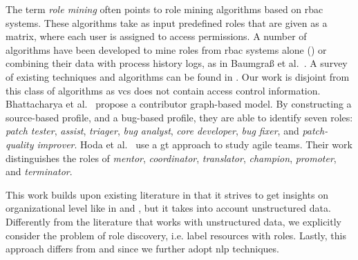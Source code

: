 The term \emph{role mining} often points to role mining algorithms based on \gls*{rbac} systems. These algorithms take as input predefined roles that are given as a matrix, where each user is assigned to access permissions. A number of algorithms have been developed to mine roles from \gls*{rbac} systems alone (\cite{Lu2015,frank2013role}) or combining their data with process history logs, as in Baumgraß et al.~\cite{baumgrass2012deriving}. A survey of existing techniques and algorithms can be found in \cite{Mitra2016}. Our work is disjoint from this class of algorithms as \gls*{vcs} does not contain access control information. 
Bhattacharya et al.~\cite{Bhattacharya2014} propose a contributor graph-based model. By constructing a source-based profile, and a bug-based profile, they are able to identify seven roles: \emph{patch tester}, \emph{assist}, \emph{triager}, \emph{bug analyst}, \emph{core developer}, \emph{bug fixer}, and \emph{patch-quality improver}. Hoda et al.~\cite{hoda2013self} use a \gls*{gt} approach to study agile teams. Their work distinguishes the roles of \emph{mentor}, \emph{coordinator}, \emph{translator}, \emph{champion}, \emph{promoter}, and \emph{terminator}.


This work builds upon existing literature in that it strives to get insights on organizational level like in \cite{rubin2007process} and \cite{Song2008}, but it takes into account unstructured data. Differently from the literature that works with unstructured data, we explicitly consider the problem of role discovery, i.e. label resources with roles. Lastly, this approach differs from \cite{Bhattacharya2014} and \cite{hoda2013self} since we further adopt \gls*{nlp} techniques.
